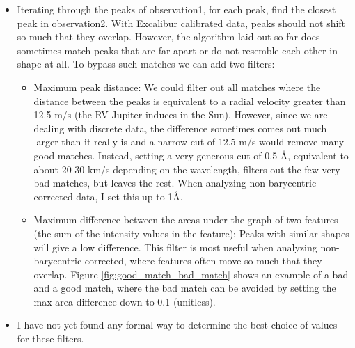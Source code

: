     \begin{itemize}
        \item Iterating through the peaks of observation1, for each peak, find the closest peak in observation2. With Excalibur calibrated data, peaks should not shift so much that they overlap. However, the algorithm laid out so far does sometimes match peaks that are far apart or do not resemble each other in shape at all. To bypass such matches we can add two filters:
        \begin{itemize}
            \item Maximum peak distance: We could filter out all matches where the distance between the peaks is equivalent to a radial velocity greater than 12.5 m/s (the RV Jupiter induces in the Sun). However, since we are dealing with discrete data, the difference sometimes comes out much larger than it really is and a narrow cut of 12.5 m/s would remove many good matches. Instead, setting a very generous cut of 0.5 Å, equivalent to about 20-30 km/s depending on the wavelength, filters out the few very bad matches, but leaves the rest. When analyzing non-barycentric-corrected data, I set this up to 1Å. 
            
            \item Maximum difference between the areas under the graph of two features (the sum of the intensity values in the feature): Peaks with similar shapes will give a low difference. This filter is most useful when analyzing non-barycentric-corrected, where features often move so much that they overlap. Figure \ref{fig:good_match_bad_match} shows an example of a bad and a good match, where the bad match can be avoided by setting the max area difference down to 0.1 (unitless). 
        \end{itemize}
        \item I have not yet found any formal way to determine the best choice of values for these filters.
    \end{itemize}


